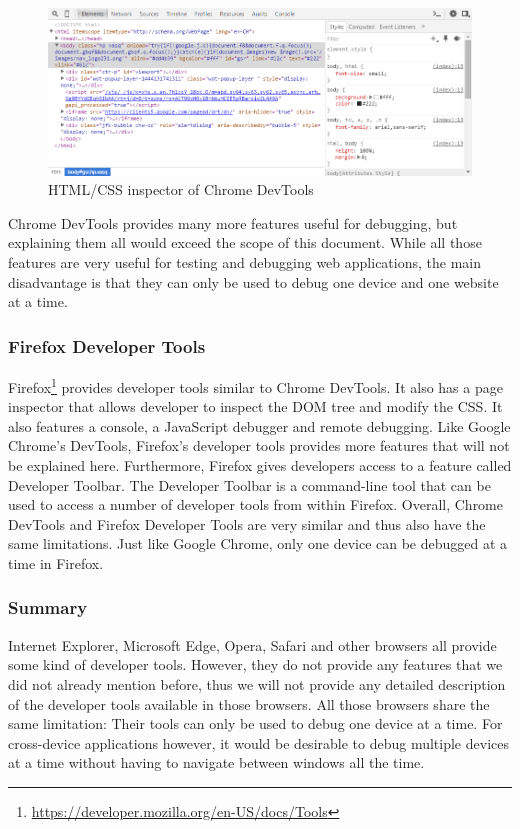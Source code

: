 \begin{figure}[H]
  \centering
    \includegraphics[width=1.0\textwidth]{images/relatedwork/chrome_devtools_3.png}
	\caption[Screenshot: Chrome DevTools]{HTML/CSS inspector of Chrome DevTools}
	\label{fig:chrome_devtools}
\end{figure}

Chrome DevTools provides many more features useful for debugging, but explaining them all would exceed the scope of this document. While all those features are very useful for testing and debugging web applications, the main disadvantage is that they can only be used to debug one device and one website at a time.

\subsubsection{Firefox Developer Tools}

Firefox\footnote{\url{https://developer.mozilla.org/en-US/docs/Tools}} provides developer tools similar to Chrome DevTools. It also has a page inspector that allows developer to inspect the DOM tree and modify the CSS. It also features a console, a JavaScript debugger and remote debugging. Like Google Chrome's DevTools, Firefox's developer tools provides more features that will not be explained here. Furthermore, Firefox gives developers access to a feature called Developer Toolbar. The Developer Toolbar is a command-line tool that can be used to access a number of developer tools from within Firefox. Overall, Chrome DevTools and Firefox Developer Tools are very similar and thus also have the same limitations. Just like Google Chrome, only one device can be debugged at a time in Firefox.

\subsubsection{Summary}

Internet Explorer, Microsoft Edge, Opera, Safari and other browsers all provide some kind of developer tools. However, they do not provide any features that we did not already mention before, thus we will not provide any detailed description of the developer tools available in those browsers. All those browsers share the same limitation: Their tools can only be used to debug one device at a time. For cross-device applications however, it would be desirable to debug multiple devices at a time without having to navigate between windows all the time.


